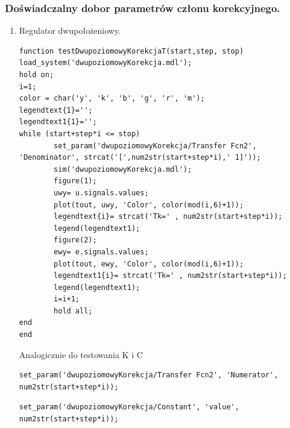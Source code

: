 \documentclass[a4paper,10pt]{article}
\begin{document}
\subsubsection{Doświadczalny dobor parametrów członu korekcyjnego.}\label{sec:zad2_2}
\begin{enumerate}
		\item Regulator dwupołożeniowy.
		
\begin{lstlisting}[caption=Funkcja testująca regulator dwupoziomowy z korekcją zmiana T.]
function testDwupoziomowyKorekcjaT(start,step, stop)
load_system('dwupoziomowyKorekcja.mdl');
hold on;
i=1;
color = char('y', 'k', 'b', 'g', 'r', 'm');
legendtext{1}='';
legendtext1{1}='';
while (start+step*i <= stop)
        set_param('dwupoziomowyKorekcja/Transfer Fcn2', 'Denominator', strcat('[',num2str(start+step*i),' 1]'));
        sim('dwupoziomowyKorekcja.mdl');
        figure(1);
        uwy= u.signals.values;    
        plot(tout, uwy, 'Color', color(mod(i,6)+1));        
        legendtext{i}= strcat('Tk=' , num2str(start+step*i));
        legend(legendtext1);
        figure(2);
        ewy= e.signals.values;    
        plot(tout, ewy, 'Color', color(mod(i,6)+1));        
        legendtext1{i}= strcat('Tk=' , num2str(start+step*i));
        legend(legendtext1);
        i=i+1;
        hold all;
end
end
\end{lstlisting}

Analogicznie do testowania K i C

\begin{lstlisting}[caption=set param dla K.]
set_param('dwupoziomowyKorekcja/Transfer Fcn2', 'Numerator', num2str(start+step*i));
\end{lstlisting}

\begin{lstlisting}[caption=set param dla C.]
set_param('dwupoziomowyKorekcja/Constant', 'value', num2str(start+step*i));
\end{lstlisting}

\newpage


\end{enumerate}
\end{document}
